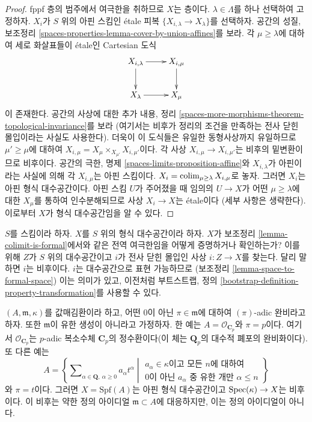 \begin{proof}
fppf 층의 범주에서 여극한을 취하므로 $X$는 층이다.
$\lambda \in \Lambda$를 하나 선택하여 고정하자.
$X_i$가 $S$ 위의 아핀 스킴인 \'etale 피복
$\{X_{i, \lambda} \to X_\lambda\}$를 선택하자. 공간의 성질,
보조정리 \ref{spaces-properties-lemma-cover-by-union-affines}를
보라. 각 $\mu \geq \lambda$에 대하여 세로 화살표들이 \'etale인
Cartesian 도식
$$
\xymatrix{
X_{i, \lambda} \ar[r] \ar[d] & X_{i, \mu} \ar[d] \\
X_\lambda \ar[r] & X_\mu
}
$$
이 존재한다. 공간의 사상에 대한 추가 내용, 정리
\ref{spaces-more-morphisms-theorem-topological-invariance}를 보라
(여기서는 비후가 정리의 조건을 만족하는 전사 닫힌 몰입이라는
사실도 사용한다). 더욱이 이 도식들은 유일한 동형사상까지 유일하므로
$\mu' \geq \mu$에 대하여
$X_{i, \mu} = X_\mu \times_{X_{\mu'}} X_{i, \mu'}$이다.
각 사상 $X_{i, \mu} \to X_{i, \mu'}$는 비후의 밑변환이므로
비후이다. 공간의 극한, 명제
\ref{spaces-limits-proposition-affine}와 $X_{i, \lambda}$가
아핀이라는 사실에 의해 각 $X_{i, \mu}$는 아핀 스킴이다.
$X_i = \mathop{\mathrm{colim}}\nolimits_{\mu \geq \lambda} X_{i, \mu}$로 놓자. 그러면
$X_i$는 아핀 형식 대수공간이다. 아핀 스킴 $U$가 주어졌을 때
임의의 $U \to X$가 어떤 $\mu \geq \lambda$에 대한 $X_\mu$를
통하여 인수분해되므로 사상 $X_i \to X$는 \'etale이다
(세부 사항은 생략한다). 이로부터 $X$가 형식 대수공간임을 알 수 있다.
\end{proof}

\noindent
$S$를 스킴이라 하자. $X$를 $S$ 위의 형식 대수공간이라 하자.
$X$가 보조정리 \ref{lemma-colimit-is-formal}에서와 같은 전역
여극한임을 어떻게 증명하거나 확인하는가? 이를 위해 $Z$가 $S$ 위의
대수공간이고 $i$가 전사 닫힌 몰입인 사상 $i : Z \to X$를 찾는다.
달리 말하면 $i$는 비후이다. $i$는 대수공간으로 표현 가능하므로
(보조정리 \ref{lemma-space-to-formal-space}) 이는 의미가 있고,
이전처럼 부트스트랩, 정의
\ref{bootstrap-definition-property-transformation}를 사용할 수 있다.

\begin{example}
\label{example-david-hansen}
$(A, \mathfrak m, \kappa)$를 값매김환이라 하고, 어떤
0이 아닌 $\pi \in \mathfrak m$에 대하여 $(\pi)$-adic 완비라고
하자. 또한 $\mathfrak m$이 유한 생성이 아니라고 가정하자.
한 예는 $A = \mathcal{O}_{\mathbf{C}_p}$와 $\pi = p$이다.
여기서 $\mathcal{O}_{\mathbf{C}_p}$는 $p$-adic 복소수체
$\mathbf{C}_p$의 정수환이다(이 체는 $\mathbf{Q}_p$의 대수적
폐포의 완비화이다). 또 다른 예는
$$
A =
\left\{
\sum\nolimits_{\alpha \in \mathbf{Q},\ \alpha \geq 0} a_\alpha t^\alpha
\middle|
\begin{matrix}
a_\alpha \in \kappa \text{이고 모든 }n\text{에 대하여} \\
\text{0이 아닌 }a_\alpha
\text{ 중 유한 개만 }\alpha \leq n
\end{matrix}
\right\}
$$
와 $\pi = t$이다. 그러면 $X = \text{Spf}(A)$는 아핀 형식
대수공간이고 $\mathop{\mathrm{Spec}}(\kappa) \to X$는 비후이다. 이 비후는 약한
정의 아이디얼 $\mathfrak m \subset A$에 대응하지만, 이는 정의
아이디얼이 아니다.
\end{example}

